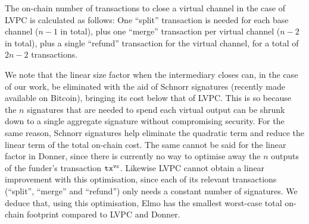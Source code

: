   The on-chain number of transactions to close a virtual channel in the case of
  LVPC is calculated as follows: One ``split'' transaction is needed for each
  base channel ($n-1$ in total), plus one ``merge'' transaction per virtual
  channel ($n-2$ in total), plus a single ``refund'' transaction for the virtual
  channel, for a total of $2n-2$ transactions.

  We note that the linear size factor when the intermediary closes can, in the
  case of our work, be eliminated with the aid of Schnorr signatures (recently
  made available on Bitcoin), bringing its cost below that of LVPC. This is so
  because the $n$ signatures that are
  needed to spend each virtual output can be shrunk down to a single aggregate
  signature without compromising security. For the same reason, Schnorr
  signatures help eliminate the quadratic term and reduce the linear term of the
  total on-chain cost. The same cannot be said for the linear factor in Donner,
  since there is currently no way to optimise away the $n$ outputs of the
  funder's transaction $\texttt{tx}^{\mathtt{vc}}$. Likewise LVPC cannot obtain a linear
  improvement with this optimisation, since each of its relevant transactions
  (``split'', ``merge'' and ``refund'') only needs a constant number of
  signatures. We deduce that, using this optimisation, Elmo has the smallest
  worst-case total on-chain footprint compared to LVPC and Donner.

